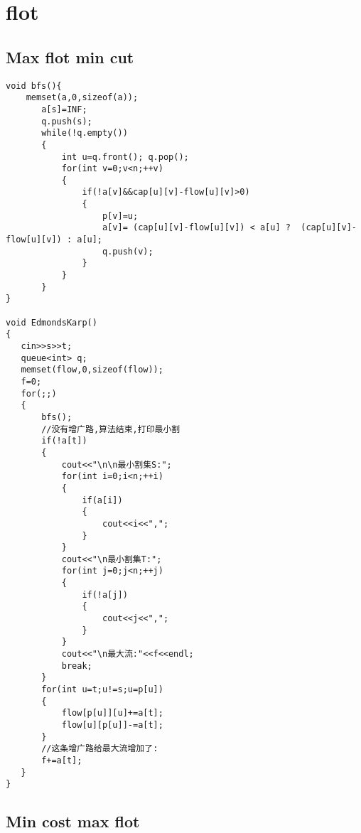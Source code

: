 \section{flot}
\subsection{Max flot min cut}
\begin{lstlisting}
void bfs(){
	memset(a,0,sizeof(a));
       a[s]=INF;
       q.push(s);
       while(!q.empty())
       {
           int u=q.front(); q.pop();
           for(int v=0;v<n;++v)
           {
               if(!a[v]&&cap[u][v]-flow[u][v]>0)
               {
                   p[v]=u;
                   a[v]= (cap[u][v]-flow[u][v]) < a[u] ?  (cap[u][v]-flow[u][v]) : a[u];
                   q.push(v);
               }
           }
       }
}

void EdmondsKarp()
{
   cin>>s>>t;
   queue<int> q;
   memset(flow,0,sizeof(flow));
   f=0;
   for(;;)
   {
       bfs();
       //没有增广路,算法结束,打印最小割
       if(!a[t])
       {
           cout<<"\n\n最小割集S:";
           for(int i=0;i<n;++i)
           {
               if(a[i])
               {
                   cout<<i<<",";
               }
           }
           cout<<"\n最小割集T:";
           for(int j=0;j<n;++j)
           {
               if(!a[j])
               {
                   cout<<j<<",";
               }
           }
           cout<<"\n最大流:"<<f<<endl;
           break;
       }
       for(int u=t;u!=s;u=p[u])
       {
           flow[p[u]][u]+=a[t];
           flow[u][p[u]]-=a[t];
       }
       //这条增广路给最大流增加了:
       f+=a[t];
   }
}
\end{lstlisting}
\subsection{Min cost max flot}
